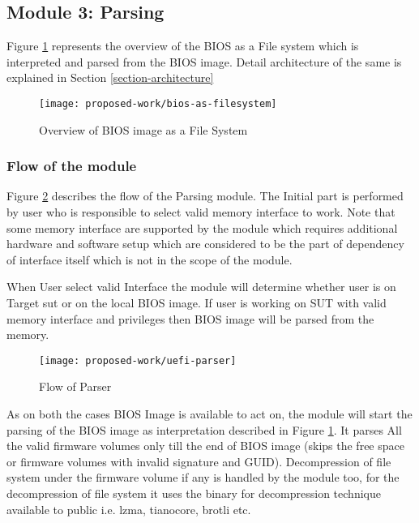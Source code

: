 \subsection{Module 3: Parsing}\label{module-parsing}
Figure \ref{fig:bios-as-filesystem} represents the overview of the BIOS as a File system  which is interpreted and parsed from the BIOS image. Detail architecture of the same is explained in Section \ref{section-architecture}

\begin{figure}[!htbp]
	\centering
	\texttt{[image: proposed-work/bios-as-filesystem]}
	\caption{Overview of BIOS image as a File System}\label{fig:bios-as-filesystem}
\end{figure}

\subsubsection{Flow of the module}
Figure \ref{fig:uefi-parser} describes the flow of the Parsing module. The Initial part is performed by user who is responsible to select valid memory interface to work. Note that some memory interface are supported by the module which requires additional hardware and software setup which are considered to be the part of dependency of interface itself which is not in the scope of the module.

When User select valid Interface the module will determine whether user is on Target \gls{sut} or on the local BIOS image.
If user is working on SUT with valid memory interface and privileges then BIOS image will be parsed from the memory.

\begin{figure}[!htbp]
	\centering
	\texttt{[image: proposed-work/uefi-parser]}
	\caption{Flow of Parser}\label{fig:uefi-parser}
\end{figure}

As on both the cases BIOS Image is available to act on, the module will start the parsing of the BIOS image as interpretation described in Figure \ref{fig:bios-as-filesystem}. It parses All the valid firmware volumes only till the end of BIOS image (skips the free space or firmware volumes with invalid signature and GUID). Decompression of file system under the firmware volume if any is handled by the module too, for the decompression of file system it uses the binary for decompression technique available to public i.e. lzma, tianocore, brotli etc.


